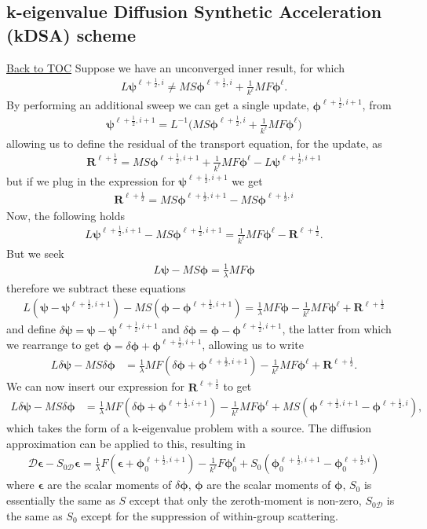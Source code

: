\documentclass[11pt,letterpaper,notitlepage]{article}
\newcommand{\beqn}{\begin{equation}
		\begin{aligned}}
\newcommand{\eeqn}{\end{aligned}
\end{equation}}
\numberwithin{equation}{section}
\newcommand{\Linv}{L^{-1}}
\newcommand{\bphi}{\boldsymbol{\phi}}
\newcommand{\bpsi}{\boldsymbol{\psi}}
\newcommand{\half}{\frac{1}{2}}
\newcommand{\bepsilon}{\boldsymbol{\epsilon}}
\newcommand{\BackToTOC}{\hyperlink{toc}{\scriptsize{\color{blue}Back to TOC}}\newline}
\begin{document}
\subsection{k-eigenvalue Diffusion Synthetic Acceleration (kDSA) scheme}
\BackToTOC
Suppose we have an unconverged inner result, for which
\beqn 
L\bpsi^{\ell+\half,i} \ne
MS\bphi^{\ell+\half, i} + \frac{1}{k^\ell}MF\bphi^\ell.
\eeqn 
By performing an additional sweep we can get a single update, $\bphi^{\ell+\half,i+1}$, from
\beqn 
\bpsi^{\ell+\half,i+1} = \Linv \biggr(
MS\bphi^{\ell+\half, i} + \frac{1}{k^\ell}MF\bphi^\ell
\biggr)
\eeqn 
allowing us to define the residual of the transport equation, for the update, as 
\beqn
\mathbf{R}^{\ell+\half} = MS\bphi^{\ell+\half,i+1} + \frac{1}{k^\ell}MF\bphi^\ell - L \bpsi^{\ell+\half,i+1}
\eeqn 
but if we plug in the expression for $\bpsi^{\ell+\half,i+1}$ we get
\beqn 
\mathbf{R}^{\ell+\half} = MS\bphi^{\ell+\half,i+1} - MS\bphi^{\ell+\half,i}
\eeqn 
\newline 
Now, the following holds
\beqn 
L \bpsi^{\ell+\half,i+1} - MS\bphi^{\ell+\half,i+1} = \frac{1}{k^\ell} MF\bphi^\ell - \mathbf{R}^{\ell+\half}.
\eeqn 
But we seek
\beqn 
L \bpsi - MS\bphi = \frac{1}{\lambda} MF\bphi
\eeqn 
therefore we subtract these equations
\beqn 
L(\bpsi-\bpsi^{\ell+\half,i+1}) -MS(\bphi - \bphi^{\ell+\half,i+1})= \frac{1}{\lambda} MF\bphi - \frac{1}{k^\ell} MF\bphi^\ell + \mathbf{R}^{\ell + \half}
\eeqn
and define $\delta \bpsi = \bpsi - \bpsi^{\ell+\half,i+1}$ and $\delta \bphi = \bphi - \bphi^{\ell+\half,i+1}$, the latter from which we rearrange to get $\bphi = \delta \bphi + \bphi^{\ell+\half,i+1}$, allowing us to write 
\beqn 
L\delta \bpsi - MS\delta \bphi &= \frac{1}{\lambda}MF(\delta \bphi + \bphi^{\ell+\half,i+1})  - \frac{1}{k^\ell} MF\bphi^\ell + \mathbf{R}^{\ell + \half}.
\eeqn 
We can now insert our expression for $\mathbf{R}^{\ell + \half}$ to get
\beqn 
L\delta \bpsi - MS\delta \bphi &= \frac{1}{\lambda}MF(\delta \bphi + \bphi^{\ell+\half,i+1})  - \frac{1}{k^\ell} MF\bphi^\ell + MS(\bphi^{\ell+\half,i+1} - \bphi^{\ell+\half,i}),
\eeqn
which takes the form of a k-eigenvalue problem with a source. The diffusion approximation can be applied to this, resulting in
\beqn 
\mathcal{D} \bepsilon - S_{0\mathcal{D}} \bepsilon = \frac{1}{\lambda}F(\bepsilon + \bphi_0^{\ell+\half,i+1}) - \frac{1}{k^\ell} F\bphi_0^\ell + S_0(\bphi_0^{\ell+\half,i+1} - \bphi_0^{\ell+\half,i})
\eeqn 
where $\bepsilon$ are the scalar moments of $\delta \bphi$, $\bphi$ are the scalar moments of $\bphi$, $S_0$ is essentially the same as $S$ except that only the zeroth-moment is non-zero, $S_{0\mathcal{D}}$ is the same as $S_0$ except for the suppression of within-group scattering.
\end{document}
